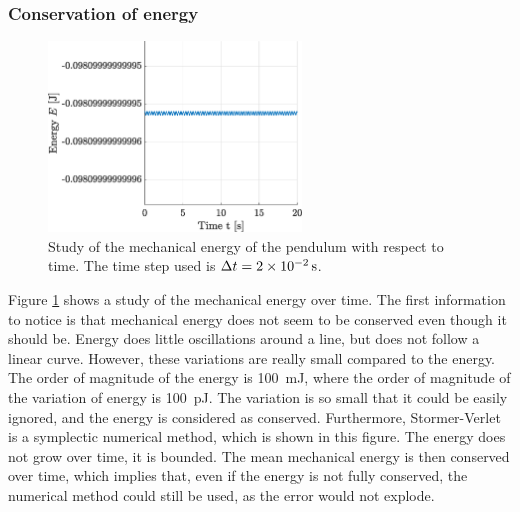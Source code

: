 \documentclass[a4paper,12pt,twoside]{article}
\begin{document}
\subsubsection{Conservation of energy}

\begin{figure}[h]
\centering
	\includegraphics[width=0.6\textwidth]{graphs/a_ener.eps}
	\caption{Study of the mechanical energy of the pendulum with respect to time. The time step used is $\Delta t = \SI{2d-2}{\s}$.}
	\label{fig:a-ener}
\end{figure}

Figure \ref{fig:a-ener} shows a study of the mechanical energy over time.
The first information to notice is that mechanical energy does not seem to be conserved even though it should be.
Energy does little oscillations around a line, but does not follow a linear curve.
However, these variations are really small compared to the energy.
The order of magnitude of the energy is \SI{100}{\milli\joule}, where the order of magnitude of the variation of energy is \SI{100}{\pico\joule}. %
The variation is so small that it could be easily ignored, and the energy is considered as conserved.
Furthermore, Stormer-Verlet is a symplectic numerical method, which is shown in this figure.
The energy does not grow over time, it is bounded.
The mean mechanical energy is then conserved over time, which implies that, even if the energy is not fully conserved, the numerical method could still be used, as the error would not explode. %
\end{document}
